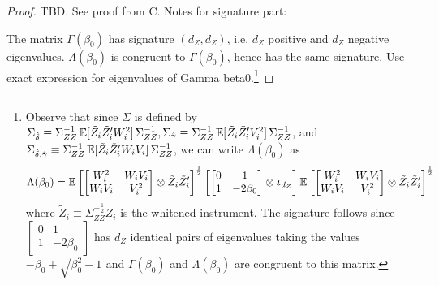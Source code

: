 \begin{proof}
    TBD. See proof from C. Notes for signature part:

    The matrix \(\Gamma(\beta_0)\) has signature \((d_Z,d_Z)\), i.e. \(d_Z\) positive and \(d_Z\) negative eigenvalues.
\(\Lambda(\beta_0)\) is congruent to \(\Gamma(\beta_0)\), hence has the same signature. Use exact expression for eigenvalues of Gamma beta0.\footnote{Observe that since   \(\Sigma\) is defined by
    \(\Sigma_{\hat\delta} \equiv \Sigma_{ZZ}^{-1}\, \mathbb{E}[\tilde Z_i\tilde Z_i' W_i^2]\, \Sigma_{ZZ}^{-1},
\Sigma_{\hat\gamma} \equiv \Sigma_{ZZ}^{-1}\, \mathbb{E}[\tilde Z_i\tilde Z_i' V_i^2]\, \Sigma_{ZZ}^{-1}\), and
\(\Sigma_{\hat\delta,\hat\gamma} \equiv \Sigma_{ZZ}^{-1}\, \mathbb{E}[\tilde Z_i\tilde Z_i' W_i V_i]\, \Sigma_{ZZ}^{-1}\),
we can write \(\Lambda(\beta_0)\) as
\begin{align*}
    \Lambda(\beta_0) =
    \mathbb{E}\left[\begin{bmatrix}
        W_i^2   & W_iV_i \\
        W_iV_i  & V_i^2
    \end{bmatrix} \otimes \tilde Z_i\tilde Z_i' \right]^{\frac{1}{2}}
    \left[\begin{bmatrix}
        0 & 1 \\
        1 & -2\beta_0
    \end{bmatrix} \otimes \boldsymbol{\iota}_{d_Z}\right]
    \mathbb{E}\left[\begin{bmatrix}
        W_i^2   & W_iV_i \\
        W_iV_i  & V_i^2
    \end{bmatrix} \otimes \tilde Z_i\tilde Z_i' \right]^{\frac{1}{2}}
\end{align*}
where \(\tilde Z_i \equiv \Sigma_{ZZ}^{-\frac{1}{2}}Z_i\) is the whitened instrument. The signature follows since \(\left[\begin{smallmatrix}
        0 & 1 \\
        1 & -2\beta_0
    \end{smallmatrix}\right]\) has \(d_Z\) identical pairs of eigenvalues taking the values \(-\beta_0 + \sqrt{\beta_0^2-1}\) and \(\Gamma(\beta_0)\) and \(\Lambda(\beta_0)\) are congruent to this matrix.
}
\end{proof}
